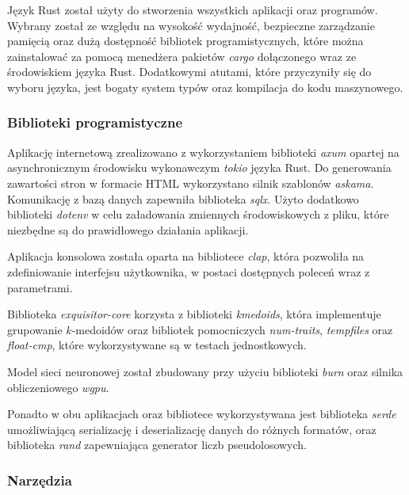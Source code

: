             Język Rust został użyty do stworzenia wszystkich aplikacji oraz programów. Wybrany został ze względu na wysokość wydajność, bezpieczne zarządzanie pamięcią oraz dużą dostępność bibliotek programistycznych, które można zainstalować za pomocą menedżera pakietów \textit{cargo}\cite{Rust:cargo} dołączonego wraz ze środowiskiem języka Rust. Dodatkowymi atutami, które przyczyniły się do wyboru języka, jest bogaty system typów oraz kompilacja do kodu maszynowego. 

        \subsubsection{Biblioteki programistyczne}

            Aplikację internetową zrealizowano z wykorzystaniem biblioteki \textit{axum}\cite{Rust:axum} opartej na asynchronicznym środowisku wykonawczym \textit{tokio}\cite{Rust:tokio} języka Rust.
            Do generowania zawartości stron w formacie HTML wykorzystano silnik szablonów \textit{askama}\cite{Rust:askama}. Komunikację z bazą danych zapewniła biblioteka \textit{sqlx}\cite{Rust:sqlx}. Użyto dodatkowo biblioteki \textit{dotenv}\cite{Rust:dotenv} w celu załadowania zmiennych środowiskowych z pliku, które niezbędne są do prawidłowego działania aplikacji.

            Aplikacja konsolowa została oparta na bibliotece \textit{clap}\cite{Rust:clap}, która pozwoliła na zdefiniowanie interfejsu użytkownika, w postaci dostępnych poleceń wraz z parametrami.

            Biblioteka \textit{exquisitor-core} korzysta z biblioteki \textit{kmedoids}\cite{Schubert:2022}, która implementuje grupowanie $k$-medoidów oraz bibliotek pomocniczych \textit{num-traits}, \textit{tempfiles} oraz \textit{float-cmp}, które wykorzystywane są w testach jednostkowych.

            Model sieci neuronowej został zbudowany przy użyciu biblioteki \textit{burn}\cite{Rust:burn} oraz silnika obliczeniowego \textit{wgpu}.

            Ponadto w obu aplikacjach oraz bibliotece wykorzystywana jest biblioteka \textit{serde}\cite{Rust:serde} umożliwiającą serializację i deserializację danych do różnych formatów, oraz biblioteka \textit{rand}\cite{Rust:rand} zapewniająca generator liczb pseudolosowych.

        \subsubsection{Narzędzia}
            
